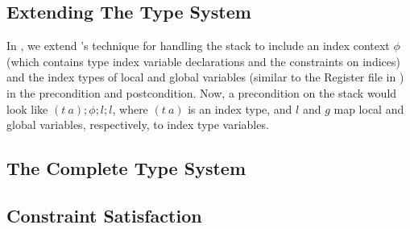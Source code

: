\subsection{Extending The \wasm Type System}

In \name, we extend \wasm's technique for handling the stack to include an index context $\phi$ (which contains type index variable declarations and the constraints on indices) and the index types of local and global variables (similar to the Register file in \dtal) in the precondition and postcondition.
Now, a precondition on the stack would look like $(t\ a); \phi; l; l$, where $(t\ a)$ is an index type, and $l$ and $g$ map local and global variables, respectively, to index type variables.


\subsection{The Complete \name Type System}



\subsection{Constraint Satisfaction}
